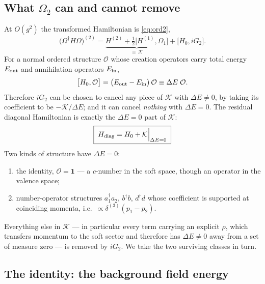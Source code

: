 \documentclass[11pt]{article}
\newcommand{\dg}{\dagger}
\newcommand{\dthree}{\delta^{(3)}}
\newcommand{\OM}{\Omega}
\begin{document}
\subsection{What $\OM_{2}$ can and cannot remove}

At $O(g^{2})$ the transformed Hamiltonian is \eqref{eq:ord2},
\begin{equation}
\Big(\OM^{\dg}H\OM\Big)^{(2)}=\underbrace{H^{(2)}+\tfrac12\big[H^{(1)},\OM_{1}\big]}_{\textstyle \equiv\,\mathcal K}
+\big[H_{0},iG_{2}\big].
\label{eq:Kdef}
\end{equation}
For a normal ordered structure $\mathcal O$ whose creation operators carry total energy
$E_{\rm out}$ and annihilation operators $E_{\rm in}$,
\begin{equation}
\big[H_{0},\mathcal O\big]=\big(E_{\rm out}-E_{\rm in}\big)\,\mathcal O\equiv\Delta E\;\mathcal O .
\end{equation}
Therefore $iG_{2}$ can be chosen to cancel any piece of $\mathcal K$ with $\Delta E\neq0$, by
taking its coefficient to be $-\mathcal K/\Delta E$; and it can cancel \emph{nothing} with
$\Delta E=0$. The residual diagonal Hamiltonian is exactly the $\Delta E=0$ part of $\mathcal K$:
\begin{equation}
\boxed{\;H_{\rm diag}=H_{0}+\mathcal K\Big|_{\Delta E=0}\;}
\label{eq:residual}
\end{equation}
Two kinds of structure have $\Delta E=0$:
\begin{enumerate}
\item[(i)] the identity, $\mathcal O=\mathbf 1$ --- a $c$-number in the soft space, though an
operator in the valence space;
\item[(ii)] number-operator structures $a^{\dg}_{1}a_{2}$, $b^{\dg}b$, $d^{\dg}d$ whose
coefficient is supported at coinciding momenta, i.e.\ $\propto\dthree(p_{1}-p_{2})$.
\end{enumerate}
Everything else in $\mathcal K$ --- in particular every term carrying an explicit $\rho$, which
transfers momentum to the soft sector and therefore has $\Delta E\neq0$ away from a set of
measure zero --- is removed by $iG_{2}$. We take the two surviving classes in turn.

\subsection{The identity: the background field energy}
\end{document}
